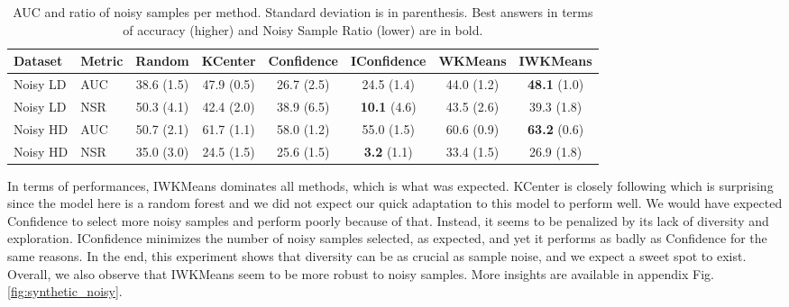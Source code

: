 \documentclass[runningheads]{llncs}
\def\bf{\bfseries}
\begin{document}
\begin{table}[htp]

  \caption{AUC and ratio of noisy samples per method. Standard deviation is in parenthesis. Best answers in terms of accuracy (higher) and Noisy Sample Ratio (lower) are in bold.}
  \label{tab:synthetic}
\centering
\begin{tabular}{llcccccc}
  \hline
  Dataset  & Metric                & Random        & KCenter          & Confidence      & IConfidence     & WKMeans           & IWKMeans            \\
  \hline
  Noisy LD & AUC                   &    38.6 (1.5) &       47.9 (0.5) &    26.7 (2.5)   &    24.5 (1.4)   &        44.0 (1.2) & {\bf 48.1} (1.0)    \\
  Noisy LD & NSR                   &    50.3 (4.1) &       42.4 (2.0) &    38.9 (6.5)   &{\bf 10.1} (4.6) &        43.5 (2.6) &      39.3  (1.8)    \\
  \hline
  Noisy HD & AUC                   &    50.7 (2.1) &       61.7 (1.1) &    58.0 (1.2)   &    55.0 (1.5)   &        60.6 (0.9) & {\bf 63.2} (0.6)    \\
  Noisy HD & NSR                   &    35.0 (3.0) &       24.5 (1.5) &    25.6 (1.5)   &{\bf 3.2} (1.1)  &        33.4 (1.5) &      26.9  (1.8)    \\
  \hline
  \end{tabular}
\end{table}
  
In terms of performances, IWKMeans dominates all methods, which is what was expected. KCenter is closely
following which is surprising since the model here is a random forest and we did not expect our quick
adaptation to this model to perform well.
We would have expected Confidence to select more noisy samples and perform poorly because of that. Instead, it seems to be penalized by its lack of diversity and exploration.
IConfidence minimizes the number of noisy samples selected, as expected, and yet it performs as badly as Confidence for the same reasons. In the end, this experiment shows that diversity can be as crucial as sample noise, and we expect a sweet spot to exist. Overall, we also observe that IWKMeans seem to be more robust to noisy samples. More insights are available in appendix Fig. \ref{fig:synthetic_noisy}.
\end{document}
